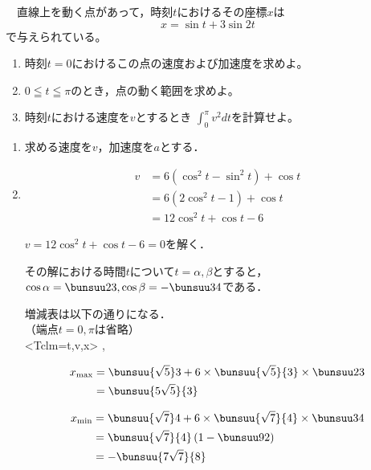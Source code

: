 \begin{problem}
　直線上を動く点があって，時刻$t$におけるその座標$x$は
\[ x=\sin t+3\sin2t \]
で与えられている。
\begin{enumerate}
\item 時刻$t=0$におけるこの点の速度および加速度を求めよ。
\item $0 \leqq t \leqq \pi$のとき，点の動く範囲を求めよ。
\item 時刻$t$における速度を$v$とするとき
$\displaystyle\int_0^\pi v^2dt$を計算せよ。
\end{enumerate}
\end{problem}

\begin{enumerate}
  \item 求める速度を$v$，加速度を$a$とする．



  \item \begin{align*}
    v &= 6(\cos^2t-\sin^2t) + \cos t\\
    &= 6(2\cos^2t-1) + \cos t\\
    &= 12\cos^2 t + \cos t - 6
  \end{align*}

  $v = 12\cos^2t + \cos t - 6 = 0$を解く．

  その解における時間$t$について$t = \alpha,\beta$とすると，
  $\cos \alpha = \bunsuu23, \cos\beta = -\bunsuu34$である．

  増減表は以下の通りになる．\\（端点$t=0,\pi$は省略）\\
  \zougenhyou%
  <Tclm={t,v,x}>%
  {\alpha,\beta}

  \begin{align*}
    x_{\mathrm{max}} &= \bunsuu{\sqrt5}3 + 6\times\bunsuu{\sqrt{5}}{3}\times\bunsuu23\\
    &=\bunsuu{5\sqrt5}{3}
  \end{align*}

  \begin{align*}
    x_{\mathrm{min}} &= \bunsuu{\sqrt7}4 + 6\times\bunsuu{\sqrt{7}}{4}\times\bunsuu34\\
    &=\bunsuu{\sqrt7}{4}\left(1-\bunsuu92\right)\\
    &=-\bunsuu{7\sqrt7}{8}
  \end{align*}


\end{enumerate}
